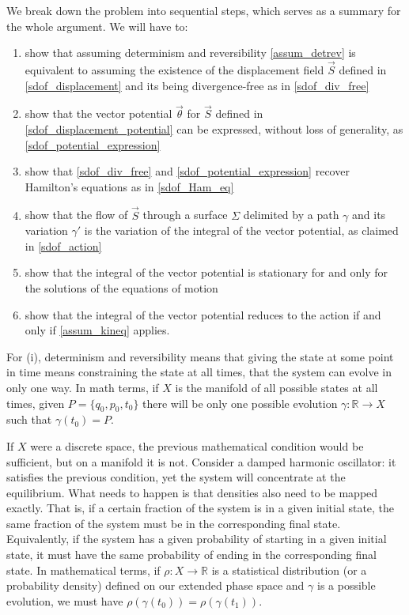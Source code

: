 \documentclass[10pt,twocolumn, nofootinbib]{revtex4-2}
\begin{document}
We break down the problem into sequential steps, which serves as a summary for the whole argument. We will have to:
\begin{enumerate}[label=(\roman*)]
	\item show that assuming determinism and reversibility \ref{assum_detrev} is equivalent to assuming the existence of the displacement field $\vec{S}$ defined in \ref{sdof_displacement} and its being divergence-free as in \ref{sdof_div_free}
	\item show that the vector potential $\vec{\theta}$ for $\vec{S}$ defined in \ref{sdof_displacement_potential} can be expressed, without loss of generality, as \ref{sdof_potential_expression}
	\item show that \ref{sdof_div_free} and \ref{sdof_potential_expression} recover Hamilton's equations as in \ref{sdof_Ham_eq}
	\item show that the flow of $\vec{S}$ through a surface $\Sigma$ delimited by a path $\gamma$ and its variation $\gamma'$ is the variation of the integral of the vector potential, as claimed in \ref{sdof_action}
	\item show that the integral of the vector potential is stationary for and only for the solutions of the equations of motion
	\item show that the integral of the vector potential reduces to the action if and only if \ref{assum_kineq} applies.
\end{enumerate}

For (i), determinism and reversibility means that giving the state at some point in time means constraining the state at all times, that the system can evolve in only one way. In math terms, if $X$ is the manifold of all possible states at all times, given $P = \{q_0, p_0, t_0\}$ there will be only one possible evolution $\gamma : \mathbb{R} \to X$ such that $\gamma(t_0) = P$.

If $X$ were a discrete space, the previous mathematical condition would be sufficient, but on a manifold it is not. Consider a damped harmonic oscillator: it satisfies the previous condition, yet the system will concentrate at the equilibrium. What needs to happen is that densities also need to be mapped exactly. That is, if a certain fraction of the system is in a given initial state, the same fraction of the system must be in the corresponding final state. Equivalently, if the system has a given probability of starting in a given initial state, it must have the same probability of ending in the corresponding final state. In mathematical terms, if $\rho : X \to \mathbb{R}$ is a statistical distribution (or a probability density) defined on our extended phase space and $\gamma$ is a possible evolution, we must have $\rho(\gamma(t_0)) = \rho(\gamma(t_1))$.
\end{document}
